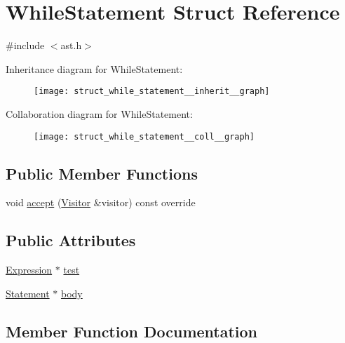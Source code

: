 \hypertarget{struct_while_statement}{}\section{While\+Statement Struct Reference}
\label{struct_while_statement}


{\ttfamily \#include $<$ast.\+h$>$}



Inheritance diagram for While\+Statement\+:
\nopagebreak
\begin{figure}[H]
\begin{center}
\leavevmode
\texttt{[image: struct\_while\_statement\_\_inherit\_\_graph]}
\end{center}
\end{figure}


Collaboration diagram for While\+Statement\+:
\nopagebreak
\begin{figure}[H]
\begin{center}
\leavevmode
\texttt{[image: struct\_while\_statement\_\_coll\_\_graph]}
\end{center}
\end{figure}
\subsection*{Public Member Functions}
\begin{DoxyCompactItemize}
\item 
void \hyperlink{struct_while_statement_a017a8824abdcb5551061dae2a09e8ead}{accept} (\hyperlink{struct_visitor}{Visitor} \&visitor) const override
\end{DoxyCompactItemize}
\subsection*{Public Attributes}
\begin{DoxyCompactItemize}
\item 
\hyperlink{struct_expression}{Expression} $\ast$ \hyperlink{struct_while_statement_acfede7e3d617c685032f657a7a95aa15}{test}
\item 
\hyperlink{struct_statement}{Statement} $\ast$ \hyperlink{struct_while_statement_adcb2abe56520e643ad7b1192099c75e6}{body}
\end{DoxyCompactItemize}


\subsection{Member Function Documentation}
\mbox{\label{struct_while_statement_a017a8824abdcb5551061dae2a09e8ead}} 
